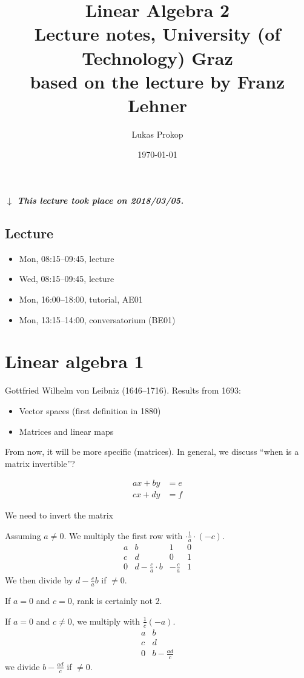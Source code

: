 \documentclass{article}
\title{
  Linear Algebra 2 \\
  \large{Lecture notes, University (of Technology) Graz} \\
  based on the lecture by Franz Lehner
}
\date{\today}
\author{Lukas Prokop}
\newcommand{\dateref}[1]{%
  \begin{mdframed}[backgroundcolor=gray!10,innerbottommargin=0pt,innertopmargin=0pt]
    \paragraph{\textit{$\downarrow$ This lecture took place on #1.}}%
  \end{mdframed}%
}
\begin{document}
\maketitle
\tableofcontents

\dateref{2018/03/05}
\subsection{Lecture}

\begin{itemize}
  \item Mon, 08:15--09:45, lecture
  \item Wed, 08:15--09:45, lecture
  \item Mon, 16:00--18:00, tutorial, AE01
  \item Mon, 13:15--14:00, conversatorium (BE01)
\end{itemize}

\section{Linear algebra 1}

Gottfried Wilhelm von Leibniz (1646--1716). Results from 1693:

\begin{itemize}
  \item Vector spaces (first definition in 1880)
  \item Matrices and linear maps
\end{itemize}

From now, it will be more specific (matrices). In general, we discuss \enquote{when is a matrix invertible}?

\begin{align*}
  ax + by &= e \\
  cx + dy &= f
\end{align*}

We need to invert the matrix

Assuming $a \neq 0$. We multiply the first row with $\cdot \frac1a \cdot (-c)$.
\[
  \begin{array}{cc|cc}
    a & b & 1 & 0 \\
    c & d & 0 & 1 \\
  \hline
    0 & d-\frac ca \cdot b & -\frac ca & 1
  \end{array}
\]
We then divide by $d - \frac ca b$ if $\neq 0$.

If $a=0$ and $c=0$, rank is certainly not $2$.

If $a=0$ and $c \neq 0$, we multiply with $\frac1c (-a)$.
\[
  \begin{array}{cc}
    a & b \\
    c & d \\
  \hline
    0 & b-\frac{ad}{c}
  \end{array}
\]
we divide $b - \frac{ad}{c}$ if $\neq 0$.
\end{document}
